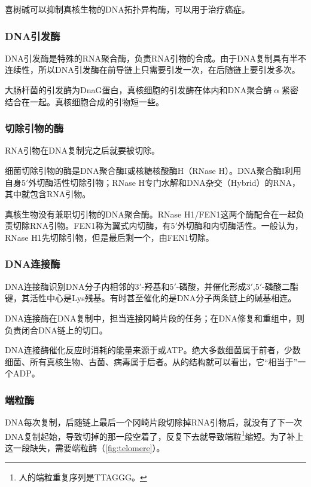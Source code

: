 喜树碱可以抑制真核生物的DNA拓扑异构酶，可以用于治疗癌症。

\subsubsection{DNA引发酶}

DNA引发酶是特殊的RNA聚合酶，负责RNA引物的合成。由于DNA复制具有半不连续性，所以DNA引发酶在前导链上只需要引发一次，在后随链上要引发多次。

大肠杆菌的引发酶为DnaG蛋白，真核细胞的引发酶在体内和DNA聚合酶$\upalpha$紧密结合在一起。真核细胞合成的引物短一些。

\subsubsection{切除引物的酶}

RNA引物在DNA复制完之后就要被切除。

细菌切除引物的酶是DNA聚合酶I或核糖核酸酶H（RNase H）。DNA聚合酶I利用自身5$\prime$外切酶活性切除引物；RNase H专门水解和DNA杂交（Hybrid）的RNA，其中就包含RNA引物。

真核生物没有兼职切引物的DNA聚合酶。RNase H1/FEN1这两个酶配合在一起负责切除RNA引物。FEN1称为翼式内切酶，有5$\prime$外切酶和内切酶活性。一般认为，RNase H1先切除引物，但是最后剩一个，由FEN1切除。

\subsubsection{DNA连接酶}

DNA连接酶识别DNA分子内相邻的3$\prime$-羟基和5$\prime$-磷酸，并催化形成3$\prime$,5$\prime$-磷酸二酯键，其活性中心是Lys残基。有时甚至催化的是DNA分子两条链上的碱基相连。

DNA连接酶在DNA复制中，担当连接冈崎片段的任务；在DNA修复和重组中，则负责闭合DNA链上的切口。

DNA连接酶催化反应时消耗的能量来源于或ATP。绝大多数细菌属于前者，少数细菌、所有真核生物、古菌、病毒属于后者。从的结构就可以看出，它“相当于”一个ADP。

\subsubsection{端粒酶}

DNA每次复制，后随链上最后一个冈崎片段切除掉RNA引物后，就没有了下一次DNA复制起始，导致切掉的那一段空着了，反复下去就导致端粒\footnote{人的端粒重复序列是TTAGGG。}缩短。为了补上这一段缺失，需要端粒酶（\autoref{fig:telomere}）。


